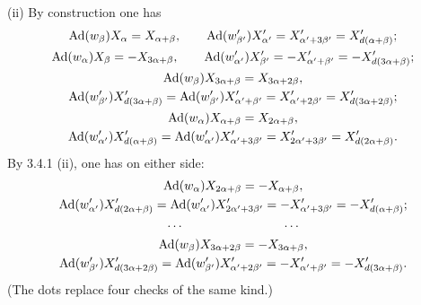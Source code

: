 (ii) By construction one has
\[
\begin{gathered}
\operatorname{Ad}(w_\beta)X_\alpha=X_{\alpha+\beta},\qquad\operatorname{Ad}(w'_{\beta'})X'_{\alpha'}=X'_{\alpha'+3\beta'}=X'_{d(\alpha+\beta)};\\
\operatorname{Ad}(w_\alpha)X_\beta=-X_{3\alpha+\beta},\qquad\operatorname{Ad}(w'_{\alpha'})X'_{\beta'}=-X'_{\alpha'+\beta'}=-X'_{d(3\alpha+\beta)};\\
\operatorname{Ad}(w_\beta)X_{3\alpha+\beta}=X_{3\alpha+2\beta},\\
\operatorname{Ad}(w'_{\beta'})X'_{d(3\alpha+\beta)}=\operatorname{Ad}(w'_{\beta'})X'_{\alpha'+\beta'}=X'_{\alpha'+2\beta'}=X'_{d(3\alpha+2\beta)};\\
\operatorname{Ad}(w_\alpha)X_{\alpha+\beta}=X_{2\alpha+\beta},\\
\operatorname{Ad}(w'_{\alpha'})X'_{d(\alpha+\beta)}=\operatorname{Ad}(w'_{\alpha'})X'_{\alpha'+3\beta'}=X'_{2\alpha'+3\beta'}=X'_{d(2\alpha+\beta)}.
\end{gathered}
\]
By 3.4.1 (ii), one has on either side:
\[
\begin{gathered}
\operatorname{Ad}(w_\alpha)X_{2\alpha+\beta}=-X_{\alpha+\beta},\\
\operatorname{Ad}(w'_{\alpha'})X'_{d(2\alpha+\beta)}=\operatorname{Ad}(w'_{\alpha'})X'_{2\alpha'+3\beta'}=-X'_{\alpha'+3\beta'}=-X'_{d(\alpha+\beta)};\\
\cdots\hspace{8em}\cdots\\
\operatorname{Ad}(w_\beta)X_{3\alpha+2\beta}=-X_{3\alpha+\beta},\\
\operatorname{Ad}(w'_{\beta'})X'_{d(3\alpha+2\beta)}=\operatorname{Ad}(w'_{\beta'})X'_{\alpha'+2\beta'}=-X'_{\alpha'+\beta'}=-X'_{d(3\alpha+\beta)}.
\end{gathered}
\]
(The dots replace four checks of the same kind.)

